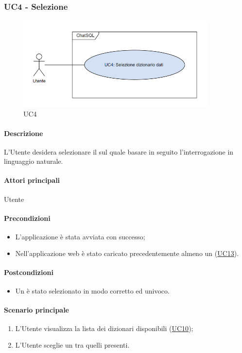 \subsubsection{UC4 - Selezione }\label{UC4}

\begin{figure}[H]
  \centering
  \includegraphics[width=0.90\textwidth]{assets/uc4.png}
  \caption{UC4}
\end{figure}

\paragraph*{Descrizione}
L’Utente desidera selezionare il  sul quale basare in seguito l’interrogazione in linguaggio naturale.

\paragraph*{Attori principali}
Utente

\paragraph*{Precondizioni}
\begin{itemize}
  \item L'applicazione è stata avviata con successo;
  \item Nell'applicazione web è stato caricato precedentemente almeno un  (\hyperref[UC13]{UC13}).
\end{itemize}

\paragraph*{Postcondizioni}
\begin{itemize}
  \item Un  è stato selezionato in modo corretto ed univoco.
\end{itemize}

\paragraph*{Scenario principale}
\begin{enumerate}
  \item L’Utente visualizza la lista dei dizionari disponibili (\hyperref[UC10]{UC10});
  \item L'Utente sceglie un  tra quelli presenti.
\end{enumerate}
